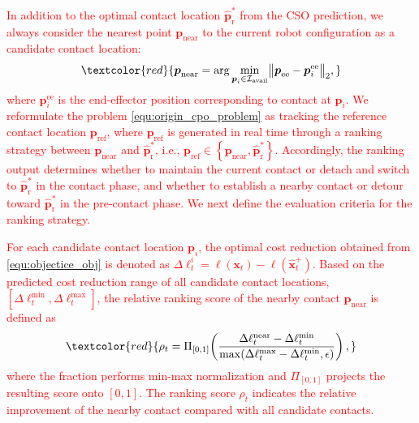 \textcolor{red}{
In addition to the optimal contact location $\boldsymbol{\hat{p}}^*_{\text{r}}$ from the CSO prediction, we always consider the nearest point $\boldsymbol{p}_{\text{near}}$ to the current robot configuration as a candidate contact location:
\begin{equation}\label{equ:nearest}
\textcolor{red}{
\boldsymbol{p}_{\mathrm{near}}
=\arg\min_{\boldsymbol{p}_i\in\mathcal{I}_{\mathrm{avail}}}
\bigl\|\boldsymbol{p}_{\mathrm{ee}}
-\boldsymbol{p}^{\mathrm{ee}}_i\bigr\|_2,
}
\end{equation}
where $\boldsymbol{p}^{\mathrm{ee}}_i$ is the end-effector position
corresponding to contact at $\boldsymbol{p}_i$. We reformulate the problem \eqref{equ:origin_cpo_problem} as tracking the reference contact location $\boldsymbol{p}_{\text{ref}}$, where $\boldsymbol{p}_{\text{ref}}$ is generated in real time through a ranking strategy between $\boldsymbol{p}_{\text{near}}$ and $\boldsymbol{\hat{p}}^*_{\text{r}}$, i.e., $\boldsymbol{p}_{\text{ref}} \in \left \{ \boldsymbol{p}_{\text{near}}, \boldsymbol{\hat{p}}^*_{\text{r}} \right \} $. Accordingly, the ranking output determines whether to maintain the current contact or detach and switch to $\boldsymbol{\hat{p}}^*_{\mathrm{r}}$ in the contact phase, and whether to establish a nearby contact or detour toward $\boldsymbol{\hat{p}}^*_{\mathrm{r}}$ in the pre-contact phase. We next define the evaluation criteria for the ranking strategy.
}

\textcolor{red}{
For each candidate contact location $\boldsymbol{p}_i$, the optimal cost reduction obtained from \eqref{equ:objectice_obj} is denoted as
$\Delta \ell_t^i
=\ell(\boldsymbol{x}_t)-\ell(\hat{\boldsymbol{x}}_t^+)$.
Based on the predicted cost reduction range of all candidate contact locations, $\left[\Delta\ell_t^{\mathrm{min}},\Delta\ell_t^{\mathrm{max}}\right]$, the relative ranking score of the nearby contact $\boldsymbol{p}_{\mathrm{near}}$ is defined as
}
\begin{equation}\label{equ:ranking1}
\textcolor{red}{
\rho_t=
\Pi_{[0,1]}\!\left(
\frac{
\Delta\ell_t^{\mathrm{near}}
-\Delta\ell_t^{\mathrm{min}}
}{\max(
\Delta\ell_t^{\mathrm{max}}
-\Delta\ell_t^{\mathrm{min}}, \epsilon)
}
\right),
}
\end{equation}
\textcolor{red}{
where the fraction performs min-max normalization and $\Pi_{[0,1]}$ projects the resulting score onto $[0,1]$.
The ranking score $\rho_t$ indicates the relative improvement of the
nearby contact compared with all candidate contacts.
}


